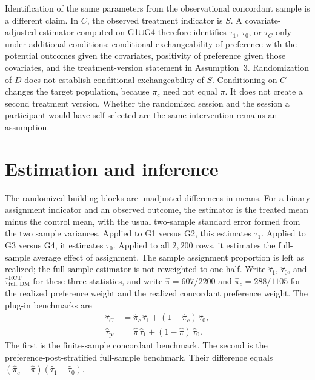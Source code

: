 \documentclass[11pt]{article}
\theoremstyle{remark}
\begin{document}
Identification of the same parameters from the observational concordant sample is a different claim. In $C$, the observed treatment indicator is $S$. A covariate-adjusted estimator computed on G1$\cup$G4 therefore identifies $\tau_1$, $\tau_0$, or $\tau_C$ only under additional conditions: conditional exchangeability of preference with the potential outcomes given the covariates, positivity of preference given those covariates, and the treatment-version statement in Assumption~3. Randomization of $D$ does not establish conditional exchangeability of $S$. Conditioning on $C$ changes the target population, because $\pi_c$ need not equal $\pi$. It does not create a second treatment version. Whether the randomized session and the session a participant would have self-selected are the same intervention remains an assumption.

\section{Estimation and inference}
\label{sec:estimation}

The randomized building blocks are unadjusted differences in means. For a binary assignment indicator and an observed outcome, the estimator is the treated mean minus the control mean, with the usual two-sample standard error formed from the two sample variances. Applied to G1 versus G2, this estimates $\tau_1$. Applied to G3 versus G4, it estimates $\tau_0$. Applied to all $2{,}200$ rows, it estimates the full-sample average effect of assignment. The sample assignment proportion is left as realized; the full-sample estimator is not reweighted to one half. Write $\widehat\tau_1$, $\widehat\tau_0$, and $\widehat\tau^{\mathrm{RCT}}_{\mathrm{full,DM}}$ for these three statistics, and write $\widehat\pi=607/2200$ and $\widehat\pi_c=288/1105$ for the realized preference weight and the realized concordant preference weight. The plug-in benchmarks are
\begin{align*}
\widehat\tau_C
&=
\widehat\pi_c\,\widehat\tau_1+(1-\widehat\pi_c)\,\widehat\tau_0,\\
\widehat\tau_{\mathrm{ps}}
&=
\widehat\pi\,\widehat\tau_1+(1-\widehat\pi)\,\widehat\tau_0.
\end{align*}
The first is the finite-sample concordant benchmark. The second is the preference-post-stratified full-sample benchmark. Their difference equals $(\widehat\pi_c-\widehat\pi)(\widehat\tau_1-\widehat\tau_0)$.
\end{document}
